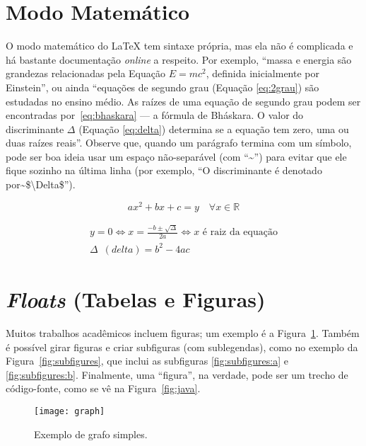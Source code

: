 \section{Modo Matemático}

O modo matemático do \LaTeX{} tem sintaxe própria, mas ela não é complicada e
há bastante documentação \emph{online} a respeito. Por exemplo, ``massa e
energia são grandezas relacionadas pela Equação $E=mc^2$, definida inicialmente
por Einstein'', ou ainda ``equações de segundo grau (Equação \ref{eq:2grau})
são estudadas no ensino médio. As raízes de uma equação de segundo grau podem
ser encontradas por~\eqref{eq:bhaskara} --- a fórmula de Bháskara.
O valor do discriminante $\Delta$ (Equação \ref{eq:delta}) determina se a
equação tem zero, uma ou duas raízes reais''. Observe que, quando um
parágrafo termina com um símbolo, pode ser boa ideia usar um espaço
não-separável (com ``\textsf{\textasciitilde}'') para evitar que ele
fique sozinho na última linha (por exemplo, ``\textsf{O discriminante é
denotado por\textasciitilde{}\$\textbackslash{}Delta\$}'').\label{orphanchar}

\begin{equation}
  \label{eq:2grau}
  ax^2+bx+c=y \quad \forall x \in \mathbb{R}
\end{equation}

\begin{gather}
\label{eq:bhaskara}
    y=0 \Leftrightarrow x=\frac{-b \pm \sqrt{\Delta}}{2a}
    \Leftrightarrow x \text{ é raiz da equação}\\
\label{eq:delta}
    \Delta\enspace(\mathit{delta}) = b^2-4ac
\end{gather}

\section{\emph{Floats} (Tabelas e Figuras)}

Muitos trabalhos acadêmicos incluem figuras; um exemplo é a
Figura~\ref{fig:humanbeta}. Também é possível girar figuras
e criar subfiguras (com sublegendas), como no exemplo da
Figura~\ref{fig:subfigures}, que inclui as
subfiguras \ref{fig:subfigures:a} e \ref{fig:subfigures:b}.
Finalmente, uma ``figura'', na verdade, pode ser um trecho de
código-fonte, como se vê na Figura~\ref{fig:java}.

\begin{figure}
  \centering
  \texttt{[image: graph]}
  \caption{Exemplo de grafo simples.}
  \label{fig:humanbeta}
\end{figure}

